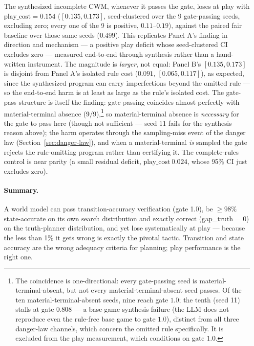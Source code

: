 \documentclass[11pt]{article}
\theoremstyle{remark}
\begin{document}
The synthesized incomplete CWM, whenever it passes the gate, loses at play with $\mathrm{play\_cost} = 0.154$ ($[0.135, 0.173]$, seed-clustered over the 9 gate-passing seeds, excluding zero; every one of the 9 is positive, $0.11$--$0.19$), against the paired fair baseline over those same seeds ($0.499$). This replicates Panel A's finding in direction and mechanism --- a positive play deficit whose seed-clustered CI excludes zero --- measured end-to-end through synthesis rather than a hand-written instrument. The magnitude is \emph{larger}, not equal: Panel B's $[0.135, 0.173]$ is disjoint from Panel A's isolated rule cost ($0.091$, $[0.065, 0.117]$), as expected, since the synthesized program can carry imperfections beyond the omitted rule --- so the end-to-end harm is at least as large as the rule's isolated cost. The gate-pass structure is itself the finding: gate-passing coincides almost perfectly with material-terminal absence (9/9),\footnote{The coincidence is one-directional: every gate-passing seed is material-terminal-absent, but not every material-terminal-absent seed passes. Of the ten material-terminal-absent seeds, nine reach gate $1.0$; the tenth (seed 11) stalls at gate $0.808$ --- a base-game synthesis failure (the LLM does not reproduce even the rule-free base game to gate $1.0$), distinct from all three danger-law channels, which concern the omitted rule specifically. It is excluded from the play measurement, which conditions on gate $1.0$.} so material-terminal absence is \emph{necessary} for the gate to pass here (though not sufficient --- seed 11 fails for the synthesis reason above); the harm operates through the sampling-miss event of the danger law (Section~\ref{sec:danger-law}), and when a material-terminal \emph{is} sampled the gate rejects the rule-omitting program rather than certifying it. The complete-rules control is near parity (a small residual deficit, $\mathrm{play\_cost}\ 0.024$, whose 95\% CI just excludes zero).

\paragraph{Summary.} A world model can pass transition-accuracy verification (gate 1.0), be $\geq 98\%$ state-accurate on its own search distribution and exactly correct (gap\_truth = 0) on the truth-planner distribution, and yet lose systematically at play --- because the less than 1\% it gets wrong is exactly the pivotal tactic. Transition and state accuracy are the wrong adequacy criteria for planning; play performance is the right one.
\end{document}
